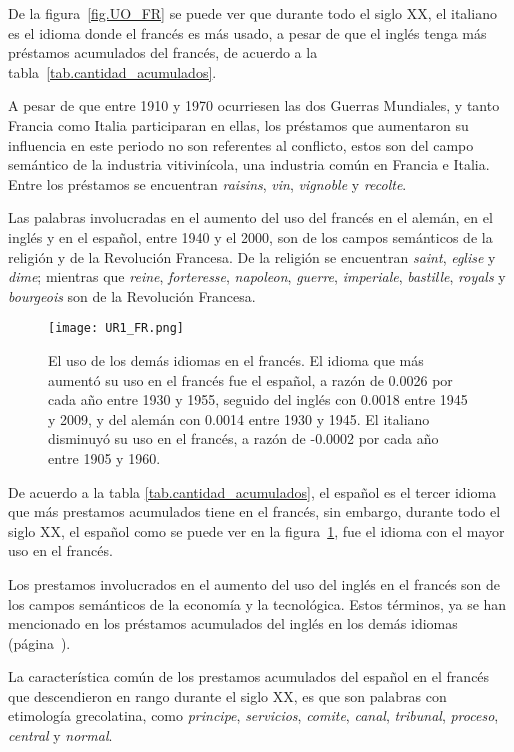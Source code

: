 De la figura~\ref{fig.UO_FR} se puede ver que durante todo el siglo XX, el italiano es el idioma donde el francés es más usado, a pesar de que el inglés tenga más préstamos acumulados del francés, de acuerdo a la tabla~\ref{tab.cantidad_acumulados}. 


A pesar de que entre 1910 y 1970 ocurriesen las dos Guerras Mundiales, y tanto Francia como Italia participaran en ellas,  los préstamos que aumentaron su influencia en este periodo no son referentes al conflicto, estos son del campo semántico de la industria vitivinícola, una industria común en Francia e Italia. Entre los préstamos se encuentran \textit{raisins}, \textit{vin}, \textit{vignoble} y \textit{recolte}. 

Las palabras involucradas en el aumento del uso del francés en el alemán, en el inglés y en el español, entre 1940 y el 2000, son de los campos semánticos de la religión y de la Revolución Francesa. De la religión se encuentran \textit{saint}, \textit{eglise} y \textit{dime}; mientras que \textit{reine}, \textit{forteresse}, \textit{napoleon}, \textit{guerre}, \textit{imperiale}, \textit{bastille}, \textit{royals} y \textit{bourgeois} son de la Revolución Francesa. 
\label{FR-D}


\begin{figure}[h!]
	\centering
	\texttt{[image: UR1\_FR.png]}
	\caption{El uso de los demás idiomas en el francés. El idioma que más aumentó su uso en el francés fue el español, a razón de  0.0026 por cada año entre 1930 y 1955, seguido del inglés con 0.0018 entre 1945 y 2009, y del alemán con 0.0014 entre 1930 y 1945. El italiano  disminuyó su uso en el francés, a razón de -0.0002 por cada año entre 1905 y 1960.}
	\label{fig.UR_FR}
\end{figure}
		
De acuerdo a la tabla \ref{tab.cantidad_acumulados},  el español es el tercer idioma que más prestamos acumulados tiene en el francés, sin embargo, durante todo el siglo XX, el español como se puede ver en la figura~\ref{fig.UR_FR}, fue el idioma con el mayor uso en el francés.

Los prestamos involucrados en el aumento del uso del inglés en el francés son de los campos semánticos de la economía y la tecnológica. Estos términos, ya se han mencionado en los préstamos acumulados del inglés en los demás idiomas (página~\pageref{EN-D}).
	
La característica común de los prestamos acumulados del español en el francés que descendieron en rango durante el siglo XX, es que son palabras con etimología grecolatina,  como \textit{principe}, \textit{servicios}, \textit{comite}, \textit{canal}, \textit{tribunal}, \textit{proceso}, \textit{central} y \textit{normal}. 
\label{D-FR}



